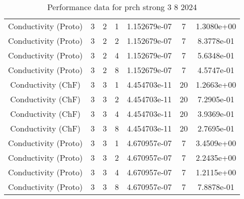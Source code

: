 \documentclass{article}
\begin{document}
\begin{small}
\begin{table}
\begin{center}
\begin{tabular}{|c|c|c|c|c|c||c|}
        Conductivity  (Proto) & 3 & 2 & 1& 1.152679e-07 & 7 & 1.3080e+00\\
        Conductivity  (Proto) & 3 & 2 & 2& 1.152679e-07 & 7 & 8.3778e-01\\
        Conductivity  (Proto) & 3 & 2 & 4& 1.152679e-07 & 7 & 5.6348e-01\\
        Conductivity  (Proto) & 3 & 2 & 8& 1.152679e-07 & 7 & 4.5747e-01\\
        \hline 
        Conductivity    (ChF) & 3 & 3 & 1& 4.454703e-11 & 20 & 1.2663e+00\\
        Conductivity    (ChF) & 3 & 3 & 2& 4.454703e-11 & 20 & 7.2905e-01\\
        Conductivity    (ChF) & 3 & 3 & 4& 4.454703e-11 & 20 & 3.9369e-01\\
        Conductivity    (ChF) & 3 & 3 & 8& 4.454703e-11 & 20 & 2.7695e-01\\
        Conductivity  (Proto) & 3 & 3 & 1& 4.670957e-07 & 7 & 3.4509e+00\\
        Conductivity  (Proto) & 3 & 3 & 2& 4.670957e-07 & 7 & 2.2435e+00\\
        Conductivity  (Proto) & 3 & 3 & 4& 4.670957e-07 & 7 & 1.2115e+00\\
        Conductivity  (Proto) & 3 & 3 & 8& 4.670957e-07 & 7 & 7.8878e-01\\
        \hline 
      \end{tabular} 
    \end{center}   
    \caption{Performance data for  prch strong 3 8 2024} 
  \end{table} 
\end{small}
\end{document}
